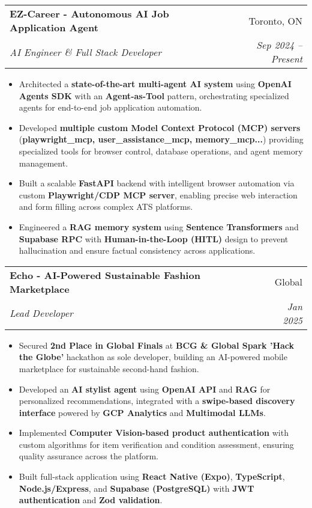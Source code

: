 \documentclass[letterpaper,10pt]{article}
\makeatletter
\newcommand{\resumeItem}[1]{
  \item\small{
    {#1 \vspace{-5pt}}
  }
}
\newcommand{\resumeSubheading}[4]{
  \vspace{-2pt}\item
    \begin{tabular*}{0.97\textwidth}[t]{l@{\extracolsep{\fill}}r}
      \textbf{#1} & #2 \\
      \textit{\small#3} & \textit{\small #4} \\
    \end{tabular*}\vspace{-7pt}
}
\newcommand{\resumeItemListStart}{\begin{itemize}}
\newcommand{\resumeItemListEnd}{\end{itemize}\vspace{-5pt}}
\makeatother
\begin{document}
\resumeSubheading
{EZ-Career - Autonomous AI Job Application Agent}{Toronto, ON}
{AI Engineer \& Full Stack Developer}{Sep 2024 -- Present}
\resumeItemListStart
  \resumeItem{Architected a \textbf{state-of-the-art multi-agent AI system} using \textbf{OpenAI Agents SDK} with an \textbf{Agent-as-Tool} pattern, orchestrating specialized agents for end-to-end job application automation.}
  \resumeItem{Developed \textbf{multiple custom Model Context Protocol (MCP) servers} (\textbf{playwright\_mcp, user\_assistance\_mcp, memory\_mcp...}) providing specialized tools for browser control, database operations, and agent memory management.}
  \resumeItem{Built a scalable \textbf{FastAPI} backend with intelligent browser automation via custom \textbf{Playwright/CDP MCP server}, enabling precise web interaction and form filling across complex ATS platforms.}
  \resumeItem{Engineered a \textbf{RAG memory system} using \textbf{Sentence Transformers} and \textbf{Supabase RPC} with \textbf{Human-in-the-Loop (HITL)} design to prevent hallucination and ensure factual consistency across applications.}
\resumeItemListEnd

\resumeSubheading
{Echo - AI-Powered Sustainable Fashion Marketplace}{Global}
{Lead Developer}{Jan 2025}
\resumeItemListStart
  \resumeItem{Secured \textbf{2nd Place in Global Finals} at \textbf{BCG \& Global Spark 'Hack the Globe'} hackathon as sole developer, building an AI-powered mobile marketplace for sustainable second-hand fashion.}
  \resumeItem{Developed an \textbf{AI stylist agent} using \textbf{OpenAI API} and \textbf{RAG} for personalized recommendations, integrated with a \textbf{swipe-based discovery interface} powered by \textbf{GCP Analytics} and \textbf{Multimodal LLMs}.}
  \resumeItem{Implemented \textbf{Computer Vision-based product authentication} with custom algorithms for item verification and condition assessment, ensuring quality assurance across the platform.}
  \resumeItem{Built full-stack application using \textbf{React Native (Expo)}, \textbf{TypeScript}, \textbf{Node.js/Express}, and \textbf{Supabase (PostgreSQL)} with \textbf{JWT authentication} and \textbf{Zod validation}.}
\resumeItemListEnd
\end{document}
